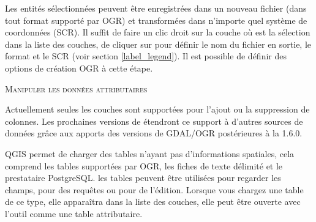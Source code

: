 
Les entités sélectionnées peuvent être enregistrées dans un nouveau fichier (dans tout format supporté par OGR) et transformées dans n'importe quel système de coordonnées (SCR). Il suffit de faire un clic droit sur la couche où est la sélection dans la liste des couches, de cliquer sur  pour définir le nom du fichier en sortie, le format et le SCR (voir section \ref{label_legend}). Il est possible de définir des options de création OGR à cette étape.

\begin{Tip}[ht]\caption{\textsc{Manipuler les données attributaires}}
Actuellement seules les couches \pg sont supportées pour l'ajout ou la 
suppression de colonnes. Les prochaines versions de \qg étendront ce support à 
d'autres sources de données grâce aux apports des versions de GDAL/OGR 
postérieures à la 1.6.0.
\end{Tip}


QGIS permet de charger des tables n'ayant pas d'informations spatiales, cela 
comprend les tables supportées par OGR, les fiches de texte délimité et le 
prestataire PostgreSQL. les tables peuvent être utilisées pour regarder les champs, 
pour des requêtes ou pour de l'édition. Lorsque vous chargez une table de ce 
type, elle apparaîtra dans la liste des couches, elle peut être ouverte avec 
l'outil  comme une table attributaire.


